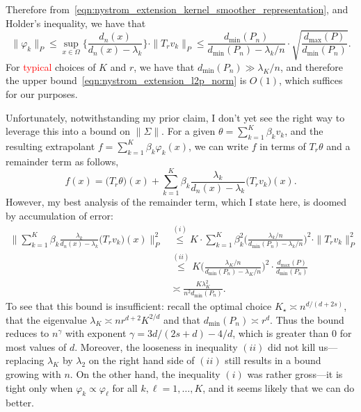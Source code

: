 \documentclass{article}
\newcommand{\1}{\mathbf{1}}
\theoremstyle{definition}
\theoremstyle{remark}
\begin{document}
Therefore from~\eqref{eqn:nystrom_extension_kernel_smoother_representation}, and Holder's inequality, we have that
\begin{equation}
\label{eqn:nystrom_extension_l2p_norm}
\|\varphi_k\|_P \leq \sup_{x \in \Omega} \biggl\{\frac{d_n(x)}{d_n(x) - \lambda_k} \biggr\} \cdot  \|T_rv_k\|_P \leq \frac{d_{\min}(P_n)}{d_{\min}(P_n) - \lambda_k/n} \cdot \sqrt{ \frac{d_{\max}(P)}{d_{\min}(P_n)}}.
\end{equation}
For \textcolor{red}{typical} choices of $K$ and $r$, we have that $d_{\min}(P_n) \gg \lambda_K/n$, and therefore the upper bound~\eqref{eqn:nystrom_extension_l2p_norm} is $O(1)$, which suffices for our purposes.

Unfortunately, notwithstanding my prior claim, I don't yet see the right way to leverage this into a bound on $\|\Sigma\|$. For a given $\theta = \sum_{k = 1}^{K} \beta_k v_k$, and the resulting extrapolant $f = \sum_{k = 1}^{K} \beta_k \varphi_k(x)$, we can write $f$ in terms of $T_r\theta$ and a remainder term as follows,
\begin{equation*}
f(x) = \bigl(T_r\theta\bigr)(x) + \sum_{k = 1}^{K} \beta_k \frac{\lambda_k}{d_n(x) - \lambda_k} \bigl(T_rv_k\bigr)(x).
\end{equation*}
However, my best analysis of the remainder term, which I state here, is doomed by accumulation of error:
\begin{align*}
\biggl\|\sum_{k = 1}^{K} \beta_k \frac{\lambda_k}{d_n(x) - \lambda_k} \bigl(T_rv_k\bigr)(x)\biggr\|_P^2 & \overset{(i)}{\leq} K \cdot \sum_{k = 1}^{K} \beta_k^2  \biggl(\frac{\lambda_k/n}{d_{\min}(P_n) - \lambda_k/n}\biggr)^2 \cdot  \|T_rv_k\|_P^2 \\
& \overset{(ii)}{\leq} K \biggl(\frac{\lambda_K/n}{d_{\min}(P_n) - \lambda_K/n}\biggr)^2 \cdot \frac{d_{\max}(P)}{d_{\min}(P_n)} \\
& \asymp \frac{K \lambda_K^2}{n^2d_{\min}(P_n)}.
\end{align*}
To see that this bound is insufficient: recall the optimal choice $K_{\star} \asymp n^{d/(d + 2s)}$, that the eigenvalue $\lambda_K \asymp nr^{d + 2}K^{2/d}$ and that $d_{\min}(P_n) \asymp r^d$. Thus the bound reduces to $n^{\gamma}$ with exponent $\gamma = 3d/(2s + d) - 4/d$, which is greater than $0$ for most values of $d$. Moreover, the looseness in inequality $(ii)$ did not kill us---replacing $\lambda_K$ by $\lambda_2$ on the right hand side of $(ii)$ still results in a bound growing with $n$. On the other hand, the inequality $(i)$ was rather gross---it is tight only when $\varphi_k \propto \varphi_{\ell}$ for all $k,\ell = 1,\ldots,K$, and it seems likely that we can do better.
\end{document}
